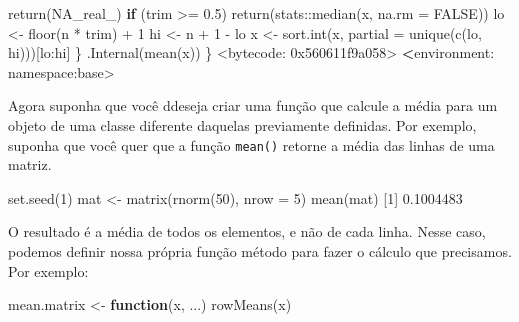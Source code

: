 \documentclass[
  10pt,
  a4paper]{book}
\newenvironment{Shaded}{\begin{snugshade}}{\end{snugshade}}
\newcommand{\AttributeTok}[1]{\textcolor[rgb]{0.77,0.63,0.00}{#1}}
\newcommand{\ConstantTok}[1]{\textcolor[rgb]{0.00,0.00,0.00}{#1}}
\newcommand{\ControlFlowTok}[1]{\textcolor[rgb]{0.13,0.29,0.53}{\textbf{#1}}}
\newcommand{\DecValTok}[1]{\textcolor[rgb]{0.00,0.00,0.81}{#1}}
\newcommand{\ErrorTok}[1]{\textcolor[rgb]{0.64,0.00,0.00}{\textbf{#1}}}
\newcommand{\FloatTok}[1]{\textcolor[rgb]{0.00,0.00,0.81}{#1}}
\newcommand{\FunctionTok}[1]{\textcolor[rgb]{0.00,0.00,0.00}{#1}}
\newcommand{\NormalTok}[1]{#1}
\newcommand{\OtherTok}[1]{\textcolor[rgb]{0.56,0.35,0.01}{#1}}
\newcommand{\SpecialCharTok}[1]{\textcolor[rgb]{0.00,0.00,0.00}{#1}}
\begin{document}
\begin{Shaded}
\begin{Highlighting}[]
            \FunctionTok{return}\NormalTok{(}\ConstantTok{NA\_real\_}\NormalTok{)}
        \ControlFlowTok{if}\NormalTok{ (trim }\SpecialCharTok{\textgreater{}=} \FloatTok{0.5}\NormalTok{) }
            \FunctionTok{return}\NormalTok{(stats}\SpecialCharTok{::}\FunctionTok{median}\NormalTok{(x, }\AttributeTok{na.rm =} \ConstantTok{FALSE}\NormalTok{))}
\NormalTok{        lo }\OtherTok{\textless{}{-}} \FunctionTok{floor}\NormalTok{(n }\SpecialCharTok{*}\NormalTok{ trim) }\SpecialCharTok{+} \DecValTok{1}
\NormalTok{        hi }\OtherTok{\textless{}{-}}\NormalTok{ n }\SpecialCharTok{+} \DecValTok{1} \SpecialCharTok{{-}}\NormalTok{ lo}
\NormalTok{        x }\OtherTok{\textless{}{-}} \FunctionTok{sort.int}\NormalTok{(x, }\AttributeTok{partial =} \FunctionTok{unique}\NormalTok{(}\FunctionTok{c}\NormalTok{(lo, hi)))[lo}\SpecialCharTok{:}\NormalTok{hi]}
\NormalTok{    \}}
    \FunctionTok{.Internal}\NormalTok{(}\FunctionTok{mean}\NormalTok{(x))}
\NormalTok{\}}
\SpecialCharTok{\textless{}}\NormalTok{bytecode}\SpecialCharTok{:} \DecValTok{0x560611f9a058}\SpecialCharTok{\textgreater{}}
\ErrorTok{\textless{}}\NormalTok{environment}\SpecialCharTok{:}\NormalTok{ namespace}\SpecialCharTok{:}\NormalTok{base}\SpecialCharTok{\textgreater{}}
\end{Highlighting}
\end{Shaded}

Agora suponha que você ddeseja criar uma função que calcule a média para
um objeto de uma classe diferente daquelas previamente definidas. Por
exemplo, suponha que você quer que a função \texttt{mean()} retorne a média das
linhas de uma matriz.

\begin{Shaded}
\begin{Highlighting}[]
\FunctionTok{set.seed}\NormalTok{(}\DecValTok{1}\NormalTok{)}
\NormalTok{mat }\OtherTok{\textless{}{-}} \FunctionTok{matrix}\NormalTok{(}\FunctionTok{rnorm}\NormalTok{(}\DecValTok{50}\NormalTok{), }\AttributeTok{nrow =} \DecValTok{5}\NormalTok{)}
\FunctionTok{mean}\NormalTok{(mat)}
\NormalTok{[}\DecValTok{1}\NormalTok{] }\FloatTok{0.1004483}
\end{Highlighting}
\end{Shaded}

O resultado é a média de todos os elementos, e não de cada linha. Nesse
caso, podemos definir nossa própria função método para fazer o cálculo
que precisamos. Por exemplo:

\begin{Shaded}
\begin{Highlighting}[]
\NormalTok{mean.matrix }\OtherTok{\textless{}{-}} \ControlFlowTok{function}\NormalTok{(x, ...) }\FunctionTok{rowMeans}\NormalTok{(x)}
\end{Highlighting}
\end{Shaded}
\end{document}
